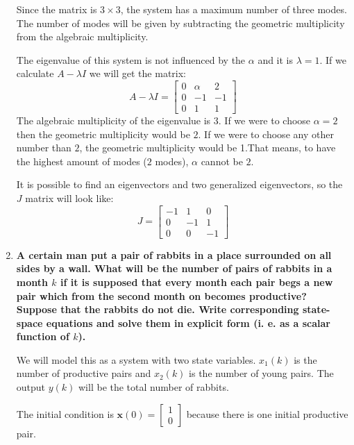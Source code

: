 \documentclass[10pt]{article}
\begin{document}
\begin{enumerate}
		Since the matrix is $3 \times 3$, the system has a maximum number of three modes. The number of modes will be given by subtracting the geometric multiplicity from the algebraic multiplicity.
		
		The eigenvalue of this system is not influenced by the $\alpha$ and it is $\lambda = 1$. If we calculate $A - \lambda I$ we will get the matrix:
		$$
		A - \lambda I = \begin{bmatrix}
			0 & \alpha & 2\\
			0 & -1 & -1\\
			0 & 1 & 1
		\end{bmatrix}
		$$
		The algebraic multiplicity of the eigenvalue is $3$.
		If we were to choose $\alpha = 2$ then the geometric multiplicity would be $2$. If we were to choose any other number than $2$, the geometric multiplicity would be 1.That means, to have the highest amount of modes ($2$ modes), $\alpha$ cannot be $2$.
		
		It is possible to find an eigenvectors and two generalized eigenvectors, so the $J$ matrix will look like:
		$$
		J = \begin{bmatrix}
			-1 & 1 & 0\\
			0 & -1 & 1\\
			0 & 0 & -1
		\end{bmatrix}
		$$
		
		\item \textbf{A certain man put a pair of rabbits in a place surrounded on all sides by a wall.
			What will be the number of pairs of rabbits in a month $k$ if it is supposed that every month each pair begs a new pair which from the second month
			on becomes productive? Suppose that the rabbits do not die. Write corresponding state-space equations and solve them in explicit form (i. e. as a scalar function of $k$).
		}
		
		We will model this as a system with two state variables. $x_1(k)$ is the number of productive pairs and $x_2(k)$ is the number of young pairs. The output $y(k)$ will be the total number of rabbits.
		
		The initial condition is $\mathbf{x}(0) = \begin{bmatrix} 1 \\ 0 \end{bmatrix}$ because there is one initial productive pair.
		

\end{enumerate}
\end{document}
